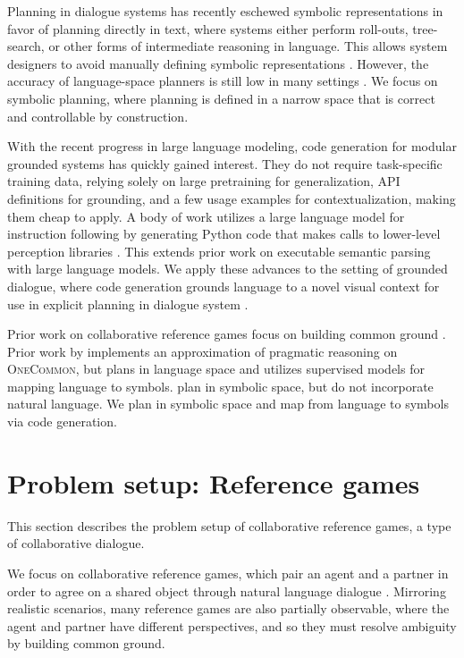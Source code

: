 \documentclass[11pt]{article}
\begin{document}
Planning in dialogue systems has recently eschewed symbolic representations in favor of
planning directly in text, 
where systems either perform roll-outs, tree-search, or other forms of intermediate reasoning in language.
This allows system designers to avoid manually defining symbolic representations \citep{yarats2017rollout,jang2020bapomdp,gandhi2023strategic}.
However, the accuracy of language-space planners is still low in many settings \citep{valmeekam2023planning}.
We focus on symbolic planning, where planning is defined in a narrow space that is correct and controllable by construction.

With the recent progress in large language modeling,
code generation for modular grounded systems has quickly gained interest.
They do not require task-specific training data, relying solely on large pretraining for generalization, API definitions for grounding, and a few usage examples for contextualization,
making them cheap to apply.
A body of work utilizes a large language model for instruction following
by generating Python code that makes calls to lower-level perception libraries
\citep{codeaspolicies2022,vipergpt,gupta2022visual,gao2023pal}.
This extends prior work on executable semantic parsing \citep{liang2016learning,johnson2017inferring,cheng2018learning} with large language models.
We apply these advances to the setting of grounded dialogue,
where code generation grounds language to a novel visual context for use in
explicit planning in dialogue system \citep{young2013pomdpsurvey}.

Prior work on collaborative reference games focus on building common ground
\citep{mf,pb,pip}.
Prior work by \citet{fried} implements an approximation of pragmatic reasoning on \textsc{OneCommon}, but plans in language space and utilizes supervised models for mapping language to symbols.
\citet{pip} plan in symbolic space, but do not incorporate natural language. 
We plan in symbolic space and map from language to symbols via code generation.

\section{Problem setup: Reference games}
This section describes the problem setup of collaborative reference games, a type of collaborative dialogue.

We focus on collaborative reference games, which
pair an agent and a partner in order to agree on a shared object through natural language dialogue \citep{pb,pip,mf,onecommon}.
Mirroring realistic scenarios, many reference games are also partially observable,
where the agent and partner have different perspectives, and so they must resolve ambiguity by building common ground.
\end{document}
